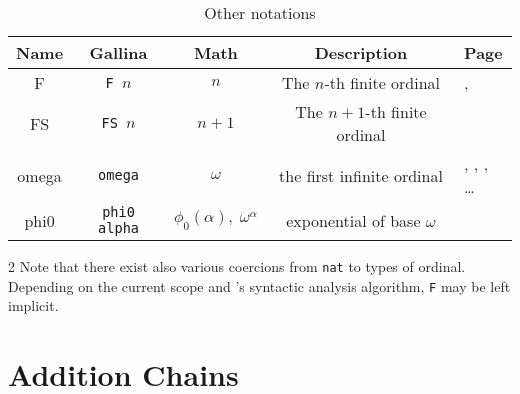 \documentclass[a4paper]{book}
\begin{document}
\begin{table}[H]
  \centering
  \begin{threeparttable}
    \caption{Other notations}
\begin{tabular}{|c|c|c|c|l|}
\hline
Name & Gallina&Math& Description& Page \\\hline
F & \texttt{F $n$} & $n$ & The $n$-th finite ordinal &  
\pageref{sect:notation-F}, \pageref{sect:notation-F-sch}\\ 
FS & \texttt{FS $n$} & $n+1$ & The $n+1$-th finite ordinal  \tnote{2} &  
\pageref{sect:notation-FS}\\ 
omega & \texttt{omega} & $\omega$ &   the first infinite ordinal   & \pageref{sect:notation-omega}, \pageref{sect:omega-T1}, \pageref{sect:omega-notation2}, \dots\\
phi0     & \texttt{phi0 alpha} & $\phi_0(\alpha),\; \omega^\alpha$&exponential of base $\omega$ & \pageref{sect:notation-phi0}\\

\hline
\end{tabular}

\begin{tablenotes}
  \item [2] Note that there exist also various coercions from \texttt{nat} to types of ordinal. Depending on the current scope and  \coq's syntactic analysis algorithm, \texttt{F} may be left implicit.
\end{tablenotes}
  \end{threeparttable}
 
\end{table}

\section{Addition Chains}

\begin{todo}
\end{todo}
\end{document}
